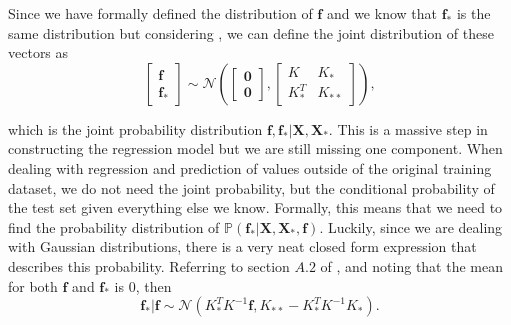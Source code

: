 Since we have formally defined the distribution of $\boldsymbol{f}$ and we know that $\boldsymbol{f}_*$ is the same distribution but considering , we can define the joint distribution of these vectors as 
\begin{equation}
	\label{joint_dist}
	\begin{bmatrix}
		\boldsymbol{f} \\
		\boldsymbol{f}_*
	\end{bmatrix} \sim \mathcal{N}\left( \begin{bmatrix}
		\boldsymbol{0} \\
		\boldsymbol{0}
	\end{bmatrix} , \begin{bmatrix}
		K & K_* \\
		K_*^T & K_{**}
	\end{bmatrix} \right), 
\end{equation}

which is the joint probability distribution $\boldsymbol{f}, \boldsymbol{f}_* | \boldsymbol{X}, \boldsymbol{X}_*$. This is a massive step in constructing the regression model but we are still missing one component. When dealing with regression and prediction of values outside of the original training dataset, we do not need the joint probability, but the conditional probability of the test set given everything else we know. Formally, this means that we need to find the probability distribution of $\mathbb{P}(\boldsymbol{f}_* | \boldsymbol{X}, \boldsymbol{X}_*, \boldsymbol{f})$. Luckily, since we are dealing with Gaussian distributions, there is a very neat closed form expression that describes this probability. Referring to section $A.2$ of \cite{rasmussen2006gaussian}, and noting that the mean for both $\boldsymbol{f}$ and $\boldsymbol{f}_*$ is 0, then 
\[ \boldsymbol{f}_* | \boldsymbol{f} \sim \mathcal{N}(K_*^T K^{-1} \boldsymbol{f}, K_{**} - K_*^T K^{-1} K_*). \]


